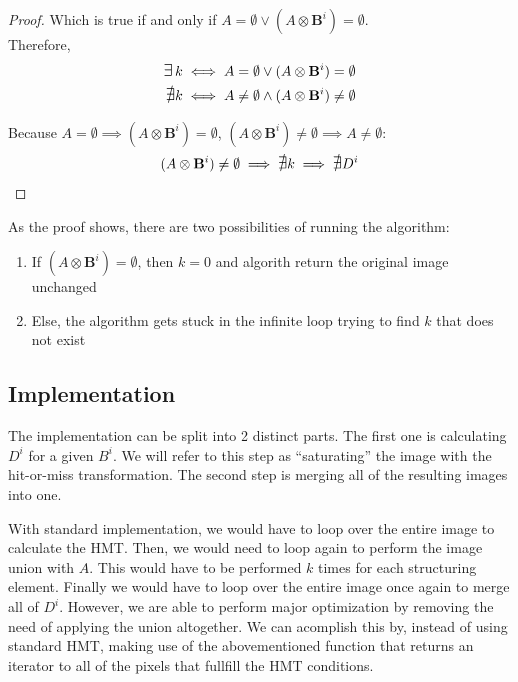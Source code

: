 \documentclass[12pt]{article}
\begin{document}
\begin{proof}
    Which is true if and only if $A = \emptyset \lor (A\otimes\mathbf{B}^i) = \emptyset$.\\
    Therefore,
    \begin{align*}
        \bigexists k \iff A = \emptyset \lor (A \otimes \mathbf{B}^i) = \emptyset \\
        \mbox{\large$\mathsurround0pt\nexists$} k \iff A \neq \emptyset \land (A \otimes \mathbf{B}^i) \neq \emptyset
    \end{align*}

    Because $A = \emptyset \implies (A \otimes \mathbf{B}^i) = \emptyset$, $(A \otimes \mathbf{B}^i) \neq \emptyset \implies A \neq \emptyset$:
    \begin{equation*}
        (A \otimes \mathbf{B}^i) \neq \emptyset \implies \mbox{\large$\mathsurround0pt\nexists$} k \implies \mbox{\large$\mathsurround0pt\nexists$} D^i
    \end{equation*}
\end{proof}

As the proof shows, there are two possibilities of running the algorithm:
\begin{enumerate}
    \item If $(A \otimes \mathbf{B}^i) = \emptyset$, then $k = 0$ and algorith return the original image unchanged
    \item Else, the algorithm gets stuck in the infinite loop trying to find $k$ that does not exist
\end{enumerate}

\pagebreak[2]
\subsection{Implementation}
\label{sec:convex-hull-impl}

The implementation can be split into 2 distinct parts.
The first one is calculating $D^i$ for a given $B^i$.
We will refer to this step as ``saturating'' the image with the hit-or-miss transformation.
The second step is merging all of the resulting images into one.

With standard implementation, we would have to loop over the entire image to calculate the HMT.
Then, we would need to loop again to perform the image union with $A$.
This would have to be performed $k$ times for each structuring element.
Finally we would have to loop over the entire image once again to merge all of $D^i$.
However, we are able to perform major optimization by removing the need of applying the union altogether.
We can acomplish this by, instead of using standard HMT, making use of the abovementioned function that returns an iterator to all of the pixels that fullfill the HMT conditions.
\end{document}
